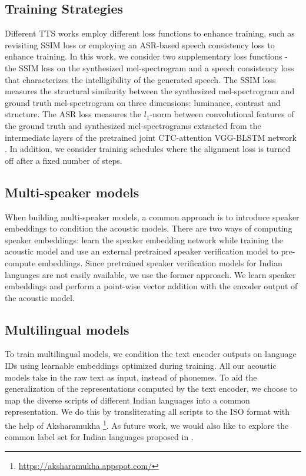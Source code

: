 \documentclass{article}
\begin{document}
\subsection{Training Strategies}
\label{subsec:training-strategies}
Different TTS works employ different loss functions to enhance training, such as revisiting SSIM loss \cite{ren2022revisiting} or employing an ASR-based speech consistency loss \cite{li2021starganv2} to enhance training.
In this work, we consider two supplementary loss functions - the SSIM loss on the synthesized mel-spectrogram and a speech consistency loss \cite{wang2004image} that characterizes the intelligibility of the generated speech.
The SSIM loss measures the structural similarity between the synthesized mel-spectrogram and ground truth mel-spectrogram on three dimensions: luminance, contrast and structure.
The ASR loss measures the $l_1$-norm between convolutional features of the ground truth and synthesized mel-spectrograms extracted from the intermediate layers of the pretrained joint CTC-attention VGG-BLSTM network \cite{li2021starganv2}.
In addition, we consider training schedules where the alignment loss is turned off after a fixed number of steps. 



\subsection{Multi-speaker models}
When building multi-speaker models, a common approach is to introduce speaker embeddings to condition the acoustic models.
There are two ways of computing speaker embeddings: learn the speaker embedding network while training the acoustic model \cite{gibiansky2017deep, ping2018deep} and use an external pretrained speaker verification model \cite{wan2018generalized} to pre-compute embeddings.
Since pretrained speaker verification models for Indian languages are not easily available, we use the former approach. 
We learn speaker embeddings and perform a point-wise vector addition with the encoder output of the acoustic model.  





\subsection{Multilingual models}
To train multilingual models, we condition the text encoder outputs on language IDs using learnable embeddings optimized during training. 
All our acoustic models take in the raw text as input, instead of phonemes.
To aid the generalization of the representations computed by the text encoder, we choose to map the diverse scripts of different Indian languages into a common representation. 
We do this by transliterating all scripts to the ISO format with the help of Aksharamukha \footnote{ \scriptsize\url{https://aksharamukha.appspot.com/}}. As future work, we would also like to explore the common label set for Indian languages proposed in \cite{baby2016unified}.
\end{document}

